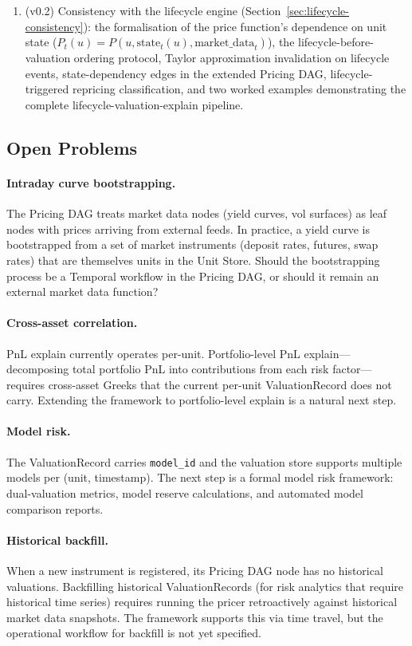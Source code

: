 \documentclass[11pt,a4paper]{article}
\begin{document}
\begin{enumerate}
\item (v0.2) Consistency with the lifecycle engine (Section~\ref{sec:lifecycle-consistency}): the formalisation of the price function's dependence on unit state ($P_t(u) = P(u, \mathrm{state}_t(u), \mathrm{market\_data}_t)$), the lifecycle-before-valuation ordering protocol, Taylor approximation invalidation on lifecycle events, state-dependency edges in the extended Pricing DAG, lifecycle-triggered repricing classification, and two worked examples demonstrating the complete lifecycle-valuation-explain pipeline.
\end{enumerate}

\subsection{Open Problems}

\paragraph{Intraday curve bootstrapping.}  The Pricing DAG treats market data nodes (yield curves, vol surfaces) as leaf nodes with prices arriving from external feeds.  In practice, a yield curve is bootstrapped from a set of market instruments (deposit rates, futures, swap rates) that are themselves units in the Unit Store.  Should the bootstrapping process be a Temporal workflow in the Pricing DAG, or should it remain an external market data function?

\paragraph{Cross-asset correlation.}  PnL explain currently operates per-unit.  Portfolio-level PnL explain---decomposing total portfolio PnL into contributions from each risk factor---requires cross-asset Greeks that the current per-unit ValuationRecord does not carry.  Extending the framework to portfolio-level explain is a natural next step.

\paragraph{Model risk.}  The ValuationRecord carries \texttt{model\_id} and the valuation store supports multiple models per (unit, timestamp).  The next step is a formal model risk framework: dual-valuation metrics, model reserve calculations, and automated model comparison reports.

\paragraph{Historical backfill.}  When a new instrument is registered, its Pricing DAG node has no historical valuations.  Backfilling historical ValuationRecords (for risk analytics that require historical time series) requires running the pricer retroactively against historical market data snapshots.  The framework supports this via time travel, but the operational workflow for backfill is not yet specified.
\end{document}
